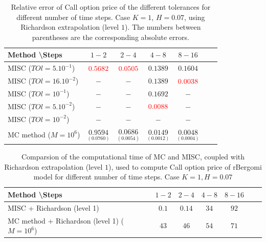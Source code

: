 \documentclass[11pt]{article}
\begin{document}
\begin{table}[h!]
	\centering
	\begin{tabular}{l*{5}{c}r}
		Method \textbackslash  Steps &$1-2$             & $2-4$ & $4-8$ & $8-16$ \\
		\hline
		MISC ($TOl=5.10^{-1}$)  &${\color{red}0.5682}$ & ${\color{red}0.0505}$ & $0.1389$ & $0.1604$ \\
		MISC ($TOl=16.10^{-2}$)  &$-$ & $-$ & $0.1389$ & ${\color{red}0.0038}$  \\
		MISC ($TOl=10^{-1}$)  &$-$ &  $-$ & $ 0.1692$ & $-$ \\
		MISC ($TOl=5.10^{-2}$) &$-$ &  $ -$ & ${\color{red}0.0088}$ & $-$   \\
		MISC ($TOl=10^{-2}$)&$-$ &  $-$ & $-$ & $-$ \\	
		MC method ($M=10^{6}$)  &$\underset{( 0.0760)}{\mathbf{0.9594}}$  & $\underset{( 0.0054)}{\mathbf{0.0686}}$  & $\underset{(   0.0012)}{\mathbf{0.0149}}$  & $\underset{(  0.0004)}{\mathbf{0.0048}}$ \\
		\hline	
		
	\end{tabular}
	\caption{Relative error of Call option price of the different tolerances for different number of time steps. Case $K=1$, $H=0.07$, using Richardson extrapolation (level $1$). The numbers between parentheses are the corresponding absolute errors.}
	\label{Relative error of Call option price of the different tolerances for different number of time steps. Case $K=1, H=0.07$ , using Richardson extrapolation}
\end{table}


\begin{table}[h!]
	\centering
	\begin{tabular}{l*{5}{c}r}
		Method \textbackslash  Steps &$1-2$             & $2-4$ & $4-8$ & $8-16$ \\
		\hline
		MISC + Richardson (level 1)  &$0.1$ & $0.14$ & $34$ & $92$ \\	
		MC method + Richardson (level 1) ($M=10^{6}$)  &$43$ & $46$  & $54$  & $71$ \\
		\hline	
		
	\end{tabular}
	\caption{Comparsion of the computational time of  MC and MISC, coupled with Richardson extrapolation (level $1$), used to compute Call option price of rBergomi model for different number of time steps. Case $K=1, H=0.07$}
	\label{Comparsion of the computational time of  MC and MISC, coupled with Richardson extrapolation (level $1$), used to compute Call option price of rBergomi model for different number of time steps. Case $K=1, H=0.07$}
\end{table}
\end{document}
